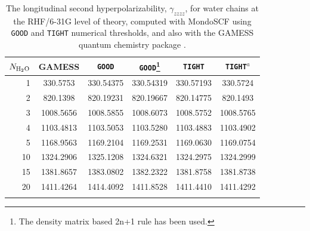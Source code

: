 \documentclass[prl,twocolumn,showpacs,twocolumngrid,superbib]{revtex4}
\begin{document}
{\begin{table}[h]
  \centering
  \caption{\protect
    The longitudinal second hyperpolarizability, $\gamma_{zzzz}$,
    for water chains at the RHF/6-31G level of theory, computed with 
    {\sc MondoSCF} using {\tt GOOD} and {\tt TIGHT} numerical thresholds, 
    and also with the {\sc GAMESS} quantum chemistry package \cite{gamess}.
  }\label{tab:Gamma_1D_Values}
  \begin{tabular}{rccccc}
    \toprule
    $N_{\rm H_2 O}$ &\multicolumn{1}{c}{{\sc GAMESS}}
    &\multicolumn{1}{c}{{\tt GOOD}}
    &\multicolumn{1}{c}{{\tt GOOD}\footnote[1]{The density matrix based 2n+1 rule has been used.}}
    &\multicolumn{1}{c}{{\tt TIGHT}}
    &\multicolumn{1}{c}{{\tt TIGHT}$^a$} \\
    \hline
     1 &  330.5753 & 330.54375 & 330.54319 & 330.57193 &  330.5724 \\
     2 &  820.1398 & 820.19231 & 820.19667 & 820.14775 &  820.1493 \\
     3 & 1008.5656 & 1008.5855 & 1008.6073 & 1008.5752 & 1008.5765 \\
     4 & 1103.4813 & 1103.5053 & 1103.5280 & 1103.4883 & 1103.4902 \\
     5 & 1168.9563 & 1169.2104 & 1169.2531 & 1169.0630 & 1169.0754 \\
    10 & 1324.2906 & 1325.1208 & 1324.6321 & 1324.2975 & 1324.2999 \\
    15 & 1381.8657 & 1383.0802 & 1382.2322 & 1381.8758 & 1381.8738 \\
    20 & 1411.4264 & 1414.4092 & 1411.8528 & 1411.4410 & 1411.4292 \\
    \botrule
  \end{tabular}
\end{table}



}
\end{document}
